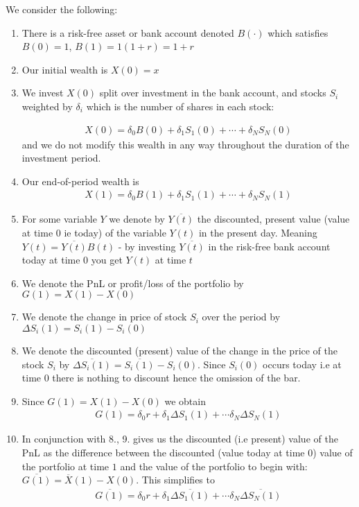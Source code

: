 \documentclass[9pt]{extarticle}
\begin{document}
We consider the following:
\begin{enumerate}
  \item There is a risk-free asset or bank account denoted $B(\cdot)$ which satisfies $B(0)=1$, $B(1)=1(1+r)=1+r$
  \item Our initial wealth is $X(0)= x$
  \item We invest $X(0)$ split over investment in the bank account, and stocks $S_i$ weighted by $\delta_i$ which is the number 
  of shares in each stock:

  \begin{align}
    X(0) = \delta_0 B(0) + \delta_1 S_1(0) + \cdots + \delta_N S_N(0)
  \end{align}
  and we do not modify this wealth in any way throughout the duration of the investment period.
  \item Our end-of-period wealth is 
   \begin{align}
    X(1) = \delta_0 B(1) + \delta_1 S_1(1) + \cdots + \delta_N S_N(1)
  \end{align}
  \item For some variable $Y$ we denote by $\overline{Y(t)}$ the discounted, present value (value at time $0$ ie today) of the variable $Y(t)$ in the 
  present day. Meaning $Y(t)= \overline{Y(t)} B(t) $ - by investing $\overline{Y(t)}$ in the risk-free bank account today at time $0$ you get $Y(t)$ at time $t$
  \item We denote the PnL or profit/loss of the portfolio by $G(1) = X(1) - X(0)$
  \item We denote the change in price of stock $S_i$ over the period by $\Delta S_i(1) = S_i(1) - S_i(0)$
  \item We denote the discounted (present) value of the change in the price of the stock $S_i$ by $\overline{\Delta S_i(1)} = \overline{S_i(1)} - S_i(0)$. Since 
  $S_i(0)$ occurs today i.e at time $0$ there is nothing to discount hence the omission of the bar.
  \item Since $G(1) = X(1) - X(0)$ we obtain 
  \begin{align}
    G(1) = \delta_0 r + \delta_1 \Delta S_1(1) + \cdots \delta_N \Delta S_N(1) 
  \end{align}
  \item In conjunction with 8., 9. gives us the discounted (i.e present) value of the PnL as the difference between the discounted (value today at time $0$) 
  value of the portfolio at time $1$ and the value of the portfolio to begin with: $\overline{G(1)} = \overline{X}(1) - X(0)$. This simplifies to
  \begin{align}
      \overline{G(1)} = \delta_0 r + \delta_1 \overline{\Delta S_1(1)} + \cdots \delta_N \overline{\Delta S_N(1)} 
  \end{align}
\end{enumerate}
\end{document}
